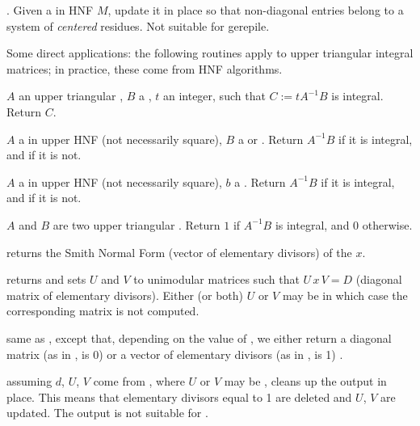 . Given a  in HNF $M$, update it in
place so that non-diagonal entries belong to a system of \emph{centered}
residues. Not suitable for gerepile.

Some direct applications: the following routines apply to upper triangular
integral matrices; in practice, these come from HNF algorithms.

 $A$ an upper triangular ,
$B$ a , $t$ an integer, such that $C := tA^{-1}B$ is integral.
Return $C$.

 $A$ a  in upper HNF (not
necessarily square), $B$ a  or . Return $A^{-1}B$ if it is
integral, and  if it is not.

 $A$ a  in upper HNF
(not necessarily square), $b$ a .  Return $A^{-1}B$ if it is
integral, and  if it is not.

 $A$ and $B$ are two upper triangular
. Return $1$ if $A^{-1} B$ is integral, and $0$ otherwise.


 returns the Smith Normal Form (vector of
elementary divisors) of the  $x$.

 returns
 and sets $U$ and $V$ to unimodular matrices such that $U\,
x\, V = D$ (diagonal matrix of elementary divisors). Either (or both) $U$ or
$V$ may be  in which case the corresponding matrix is not computed.

 same as
, except that, depending on the value of , we
either return a diagonal matrix (as in ,  is 0)
or a vector of elementary divisors (as in ,  is 1) .

 assuming $d$, $U$, $V$ come
from , where $U$ or $V$ may be ,
cleans up the output in place. This means that elementary divisors equal to 1
are deleted and $U$, $V$ are updated. The output is not suitable for
.

